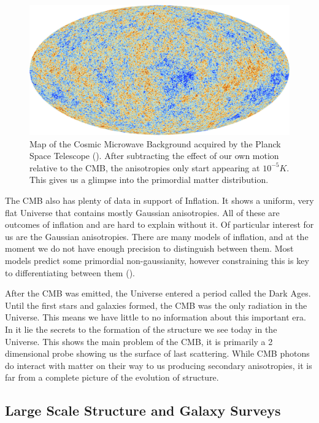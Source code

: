 \begin{figure}
    \centering
    \includegraphics[width=0.9\columnwidth]{images/misc/Planck_CMB.jpg}%
    

    \caption{
    Map of the Cosmic Microwave Background acquired by the Planck Space Telescope (\cite{2016A&A...594A..13P}). After subtracting the effect of our own motion relative to the CMB, the anisotropies only start appearing at $10^{-5} K$. This gives us a glimpse into the primordial matter distribution.
    }
    
    \label{fig:1.1}
\end{figure}

The CMB also has plenty of data in support of Inflation. It shows a uniform, very flat Universe that contains mostly Gaussian anisotropies. All of these are outcomes of inflation and are hard to explain without it. Of particular interest for us are the Gaussian anisotropies. There are many models of inflation, and at the moment we do not have enough precision to distinguish between them. Most models predict some primordial non-gaussianity, however constraining this is key to differentiating between them (\cite{2004PhR...402..103B}).

After the CMB was emitted, the Universe entered a period called the Dark Ages. Until the first stars and galaxies formed, the CMB was the only radiation in the Universe. This means we have little to no information about this important era. In it lie the secrets to the formation of the structure we see today in the Universe. This shows the main problem of the CMB, it is primarily a 2 dimensional probe showing us the surface of last scattering. While CMB photons do interact with matter on their way to us producing secondary anisotropies, it is far from a complete picture of the evolution of structure.

\subsection{Large Scale Structure and Galaxy Surveys}

